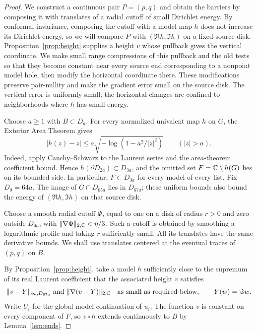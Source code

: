\begin{proof}
We construct a continuous pair $P=(p,q)$ and obtain the barriers by
composing it with translates of a radial cutoff of small Dirichlet
energy.  By conformal invariance, composing the cutoff with a model map
$h$ does not increase its Dirichlet energy, so we will compare $P$ with
$(\Re h,\Im h)$ on a fixed source disk.  Proposition~\ref{prop:height}
supplies a height $v$ whose pullback gives the vertical coordinate.
We make small range compressions of this pullback and the old tests so
that they become constant near every source end corresponding to a
nonpoint model hole, then modify the horizontal coordinate there.
These modifications preserve pair-nullity and make the gradient error
small on the source disk.  The vertical error is uniformly small; the
horizontal changes are confined to neighborhoods where $h$ has small
energy.

Choose $a\ge1$ with $B\subset D_a$.  For every normalized
univalent map $h$ on $G$, the Exterior Area Theorem gives
\begin{equation}\label{eq:sob-exterior}
 |h(z)-z|\le a\sqrt{-\log(1-a^2/|z|^2)}\qquad(|z|>a).
\end{equation}
Indeed, apply Cauchy--Schwarz to the Laurent series and the area-theorem
coefficient bound.  Hence $h(\partial D_{2a})\subset D_{3a}$, and the
omitted set $F=\mathbb C\setminus h(G)$ lies on its bounded side.  In particular,
$F\subset D_{3a}$ for every model of every list.  Fix $D_0=64a$.
The image of $G\cap D_{65a}$ lies in $D_{67a}$; these uniform bounds also
bound the energy of $(\Re h,\Im h)$ on that source disk.

Choose a smooth radial cutoff $\Phi$, equal to one on a disk of radius
$r>0$ and zero outside $D_{4a}$, with
$\|\nabla\Phi\|_{2,\mathbb C}<\eta/3$.  Such a cutoff is obtained by smoothing
a logarithmic profile and taking $r$ sufficiently small.  All its
translates have the same derivative bounds.  We shall use translates
centered at the eventual traces of $(p,q)$ on $B$.

By Proposition~\ref{prop:height}, take a model $h$ sufficiently close to
the supremum of its real Laurent coefficient that the associated height
$v$ satisfies
\begin{equation}\label{eq:height-errors-for-tests}
 \|v-Y\|_{\infty,D_{67a}}\ \hbox{and}\
 \|\nabla(v-Y)\|_{2,\mathbb C}
 \quad\hbox{as small as required below},
 \qquad Y(w)=\Im w.
\end{equation}
Write $U_i$ for the global model continuation of $u_i$.  The function
$v$ is constant on every component of $F$, so $v\circ h$ extends
continuously to $B$ by Lemma~\ref{lem:ends}.


\end{proof}
